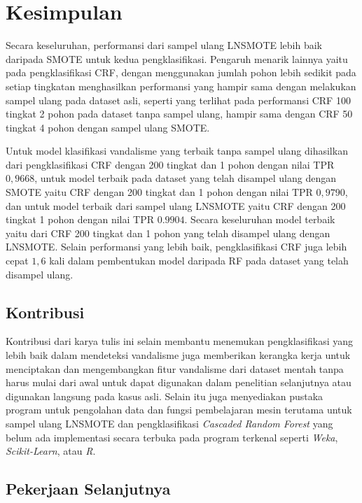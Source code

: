 \chapter{Kesimpulan}

Secara keseluruhan, performansi dari sampel ulang LNSMOTE lebih baik daripada
SMOTE untuk kedua pengklasifikasi.
Pengaruh menarik lainnya yaitu pada pengklasifikasi CRF, dengan menggunakan
jumlah pohon lebih sedikit pada setiap tingkatan menghasilkan performansi yang
hampir sama dengan melakukan sampel ulang pada dataset asli, seperti yang
terlihat pada performansi CRF 100 tingkat 2 pohon pada dataset tanpa sampel
ulang, hampir sama dengan CRF 50 tingkat 4 pohon dengan sampel ulang SMOTE.

Untuk model klasifikasi vandalisme yang terbaik tanpa sampel ulang dihasilkan
dari pengklasifikasi CRF dengan 200 tingkat dan 1 pohon dengan nilai TPR
$0,9668$,
untuk model terbaik pada dataset yang telah disampel ulang dengan SMOTE yaitu
CRF dengan 200 tingkat dan 1 pohon dengan nilai TPR $0,9790$,
dan untuk model terbaik dari sampel ulang LNSMOTE yaitu CRF dengan 200 tingkat
1 pohon dengan nilai TPR $0.9904$.
Secara keseluruhan model terbaik yaitu dari CRF 200 tingkat dan 1 pohon yang
telah disampel ulang dengan LNSMOTE.
Selain performansi yang lebih baik, pengklasifikasi CRF juga lebih cepat $1,6$
kali dalam pembentukan model daripada RF pada dataset yang telah disampel
ulang.

\section{Kontribusi}

Kontribusi dari karya tulis ini selain membantu menemukan pengklasifikasi yang
lebih baik dalam mendeteksi vandalisme juga memberikan kerangka kerja untuk
menciptakan dan mengembangkan fitur vandalisme dari dataset mentah tanpa harus
mulai dari awal untuk dapat digunakan dalam penelitian selanjutnya atau
digunakan langsung pada kasus asli. Selain itu juga menyediakan pustaka program
untuk pengolahan data dan fungsi pembelajaran mesin terutama untuk sampel ulang
LNSMOTE dan pengklasifikasi
\textit{Cascaded Random Forest} yang belum ada implementasi secara terbuka pada
program terkenal seperti \textit{Weka}, \textit{Scikit-Learn}, atau \textit{R}.

\section{Pekerjaan Selanjutnya}

